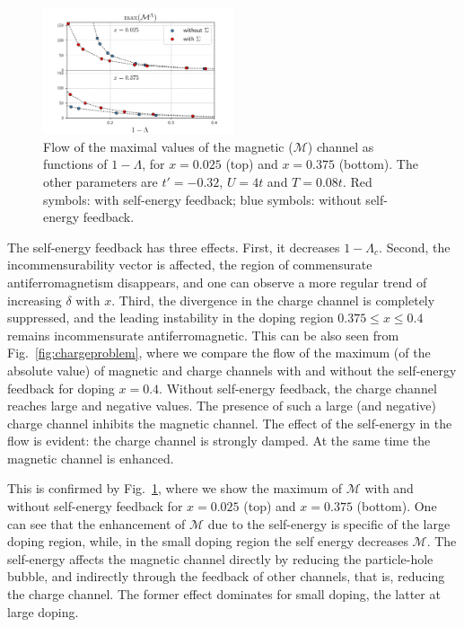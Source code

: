 \begin{figure}
\includegraphics[width=0.50\textwidth]{images/chargeproblem_M_vs_Lambda_diff_occ.png}
\caption{Flow of the maximal values of the  magnetic ($\mathcal{M}$) channel as functions of $1-\Lambda$, for  $x=0.025$ (top) and $x=0.375$ (bottom). The other parameters are $t'=-0.32$, $U=4t$ and $T=0.08t$. Red symbols: with self-energy feedback; blue symbols: without self-energy feedback. }
\label{fig:selfeffect}
\end{figure}

The self-energy feedback has three effects. First, it decreases $1-\Lambda_c$.
Second, the incommensurability vector is affected, the region of commensurate antiferromagnetism disappears, and one can observe a more regular trend of increasing $\delta$ with $x$.
Third, the divergence in the charge channel is completely suppressed, and the leading instability in the doping region $0.375\le x \le 0.4$ remains incommensurate antiferromagnetic. 
This can be also seen from Fig.~\ref{fig:chargeproblem}, where we compare the flow of the maximum (of the absolute value) of magnetic and charge channels with and without the self-energy feedback for doping $x=0.4$.
Without self-energy feedback, the charge channel reaches large and negative values.
The presence of such a large (and negative) charge channel inhibits the magnetic channel.    
The effect of the self-energy in the flow is evident: the charge channel is strongly damped.  
At the same time the magnetic channel is enhanced.

This is confirmed by Fig.~\ref{fig:selfeffect}, where we show the maximum of $\mathcal{M}$ with and without self-energy feedback for $x=0.025$ (top) and $x=0.375$ (bottom).  
One can see that the enhancement of $\mathcal{M}$ due to the self-energy is specific of the large doping region, while, in the small doping region the self energy decreases $\mathcal{M}$.  
The self-energy affects the magnetic channel directly by reducing the particle-hole bubble, and indirectly through the feedback of other channels, that is, reducing the charge channel. The former effect dominates for small doping, the latter at large doping.

